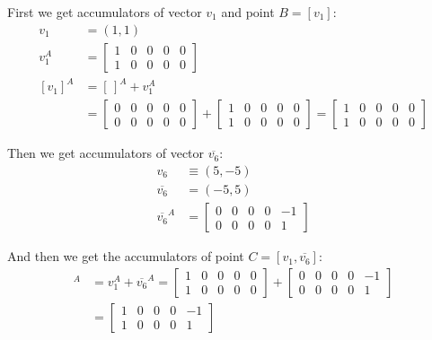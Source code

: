 \documentclass[11pt]{article}
\begin{document}
First we get accumulators of vector $v_1$ and point $B=[v_1]$:
\begin{align}
v_1 &= (1,1) \nonumber\\
v_1^A &= \left[\begin{array}{ccccc}1&0&0&0&0 \\ 1&0&0&0&0 \end{array}\right]\\
[v_1]^A &= [\hspace{2pt}]^A + v_1^A\\
 &= \left[\begin{array}{ccccc}0&0&0&0&0 \\ 0&0&0&0&0 \end{array}\right]
 + \left[\begin{array}{ccccc}1&0&0&0&0 \\ 1&0&0&0&0 \end{array}\right]
 = \left[\begin{array}{ccccc}1&0&0&0&0 \\ 1&0&0&0&0 \end{array}\right]
\end{align}

Then we get accumulators of vector $\overline{v_6}$:
\begin{align}
v_6 &\equiv (5,-5)\nonumber\\
\overline{v_6} &= (-5,5)\nonumber\\
\overline{v_6}^A &= \left[\begin{array}{ccccc}0&0&0&0&-1 \\ 0&0&0&0&1 \end{array}\right]
\end{align}

And then we get the accumulators of point $C=[v_1,\overline{v_6}]$:
\begin{align}
[v_1, \overline{v_6}]^A &= v_1^A + \overline{v_6}^A
 = \left[\begin{array}{ccccc}1&0&0&0&0 \\ 1&0&0&0&0 \end{array}\right] +
 \left[\begin{array}{ccccc}0&0&0&0&-1 \\ 0&0&0&0&1 \end{array}\right]\\
 &= \left[\begin{array}{ccccc}1&0&0&0&-1 \\ 1&0&0&0&1 \end{array}\right]
\end{align}
\end{document}
